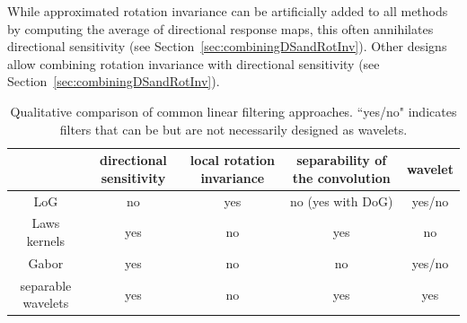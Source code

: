 \documentclass[fleqn,a4paper,oneside,openany]{book}
\begin{document}
While approximated rotation invariance can be artificially added to all methods by computing the average of directional response maps, this often annihilates directional sensitivity (see Section~\ref{sec:combiningDSandRotInv}).
Other designs allow combining rotation invariance with directional sensitivity (see Section~\ref{sec:combiningDSandRotInv}).


\begin{table}\scriptsize
\caption{Qualitative comparison of common linear filtering approaches. ``yes/no" indicates filters that can be but are not necessarily designed as wavelets.}
\label{tab:quantitativeComparison}
\begin{center}
\begin{tabular}{c|cccc|}
 & \begin{minipage}{50pt}\centering\vspace{3pt} directional sensitivity \vspace{3pt}\end{minipage} & \begin{minipage}{60pt}\centering\vspace{3pt} local rotation invariance \vspace{3pt}\end{minipage} & \begin{minipage}{90pt}\centering\vspace{3pt} separability of the convolution\vspace{3pt}\end{minipage} & wavelet \\
\hline
LoG & no & yes & no (yes with DoG) & yes/no \\
\begin{minipage}{50pt}\centering\vspace{3pt} Laws kernels \vspace{3pt}\end{minipage} & yes & no & yes & no \\
\begin{minipage}{50pt}\centering\vspace{3pt} Gabor \vspace{3pt}\end{minipage} & yes & no & no & yes/no \\
\begin{minipage}{50pt}\centering\vspace{3pt} separable wavelets \vspace{3pt}\end{minipage} & yes & no & yes & yes\\

\end{tabular}
\end{center}
\end{table}
\end{document}

